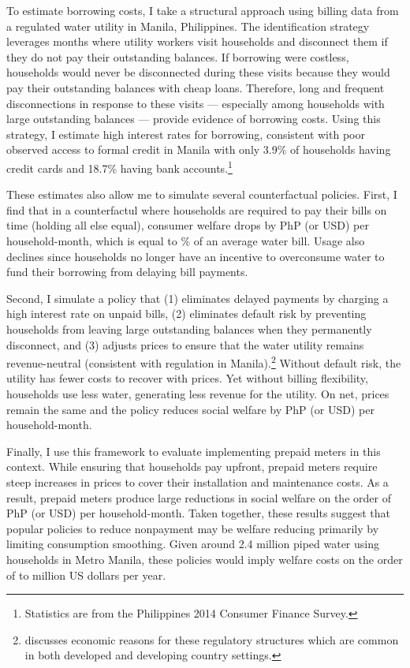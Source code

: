 \documentclass[12pt]{article}
\begin{document}
To estimate borrowing costs, I take a structural approach using billing data from a regulated water utility in Manila, Philippines.  The identification strategy leverages months where utility workers visit households and disconnect them if they do not pay their outstanding balances.  If borrowing were costless, households would never be disconnected during these visits because they would pay their outstanding balances with cheap loans.  Therefore, long and frequent disconnections in response to these visits --- especially among households with large outstanding balances --- provide evidence of borrowing costs.  Using this strategy, I estimate high interest rates for borrowing, consistent with poor observed access to formal credit in Manila with only 3.9\% of households having credit cards and 18.7\% having bank accounts.\footnote{Statistics are from the Philippines 2014 Consumer Finance Survey.}  

These estimates also allow me to simulate several counterfactual policies.  First, I find that in a counterfactul where households are required to pay their bills on time (holding all else equal), consumer welfare drops by PhP (or USD) per household-month, which is equal to \unskip\% of an average water bill.  Usage also declines since households no longer have an incentive to overconsume water to fund their borrowing from delaying bill payments.  

Second, I simulate a policy that (1) eliminates delayed payments by charging a high interest rate on unpaid bills, (2) eliminates default risk by preventing households from leaving large outstanding balances when they permanently disconnect, and (3) adjusts prices to ensure that the water utility remains revenue-neutral (consistent with regulation in Manila).\footnote{\cite{laffont2005regulation} discusses economic reasons for these regulatory structures which are common in both developed and developing country settings.}  Without default risk, the utility has fewer costs to recover with prices. Yet without billing flexibility, households use less water, generating less revenue for the utility.  On net, prices remain the same and the policy reduces social welfare by PhP (or USD) per household-month.  

Finally, I use this framework to evaluate implementing prepaid meters in this context.  While ensuring that households pay upfront, prepaid meters require steep increases in prices to cover their installation and maintenance costs.  As a result, prepaid meters produce large reductions in social welfare on the order of PhP (or USD) per household-month.  Taken together, these results suggest that popular policies to reduce nonpayment may be welfare reducing primarily by limiting consumption smoothing.  Given around 2.4 million piped water using households in Metro Manila, these policies would imply welfare costs on the order of to million US dollars per year.
\end{document}
